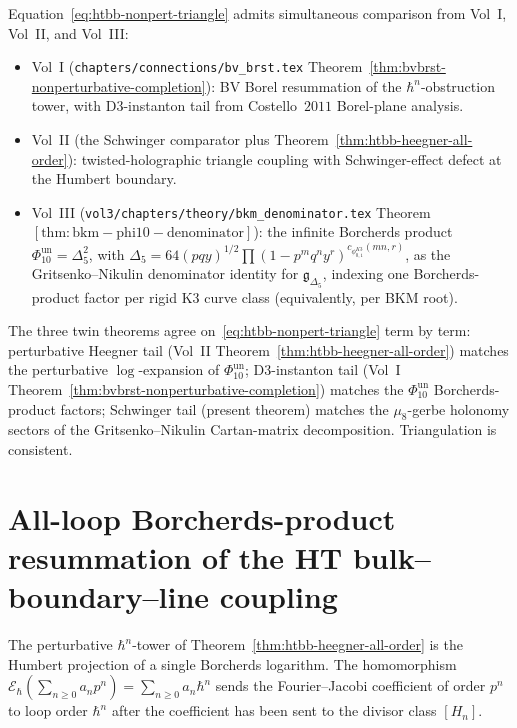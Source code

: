 \begin{remark}
\label{rem:htbb-nonpert-cross-volume}
Equation~\eqref{eq:htbb-nonpert-triangle} admits simultaneous
comparison from Vol~I, Vol~II, and Vol~III:
\begin{itemize}[leftmargin=1.8em]
\item Vol~I (\texttt{chapters/connections/bv\_brst.tex}
Theorem~\ref{thm:bvbrst-nonperturbative-completion}): BV Borel
resummation of the $\hbar^n$-obstruction tower, with
D$3$-instanton tail from Costello~$2011$ Borel-plane analysis.
\item Vol~II (the Schwinger comparator plus
Theorem~\ref{thm:htbb-heegner-all-order}): twisted-holographic
triangle coupling with Schwinger-effect defect at the Humbert
boundary.
\item Vol~III (\texttt{vol3/chapters/theory/bkm\_denominator.tex}
Theorem~$\mathrm{[thm:bkm-phi10-denominator]}$): the infinite
Borcherds product
\(\Phi_{10}^{\mathrm{un}}=\Delta_5^2\), with
\(\Delta_5=64(pqy)^{1/2}\prod(1-p^mq^ny^r)^{c_{\phi_{0,1}^{K3}}(mn,r)}\),
as the Gritsenko--Nikulin denominator identity for
$\mathfrak{g}_{\Delta_5}$, indexing one Borcherds-product factor per
rigid K$3$ curve class (equivalently, per BKM root).
\end{itemize}
The three twin theorems agree on~\eqref{eq:htbb-nonpert-triangle}
term by term: perturbative Heegner tail (Vol~II
Theorem~\ref{thm:htbb-heegner-all-order}) matches the perturbative
$\log$-expansion of $\Phi_{10}^{\mathrm{un}}$; D$3$-instanton tail (Vol~I
Theorem~\ref{thm:bvbrst-nonperturbative-completion}) matches the
$\Phi_{10}^{\mathrm{un}}$ Borcherds-product factors; Schwinger tail (present
theorem) matches the $\mu_8$-gerbe holonomy sectors of the
Gritsenko--Nikulin Cartan-matrix decomposition. Triangulation is
consistent.
\end{remark}

\section{All-loop Borcherds-product resummation of the HT
bulk--boundary--line coupling}
\label{sec:htbb-allloop-resummation}

The perturbative $\hbar^n$-tower of
Theorem~\ref{thm:htbb-heegner-all-order} is the Humbert projection of a
single Borcherds logarithm. The homomorphism
\(\mathscr E_\hbar(\sum_{n\geq0}a_np^n)=\sum_{n\geq0}a_n\hbar^n\)
sends the Fourier--Jacobi coefficient of order \(p^n\) to loop order
\(\hbar^n\) after the coefficient has been sent to the divisor class
\([H_n]\).

